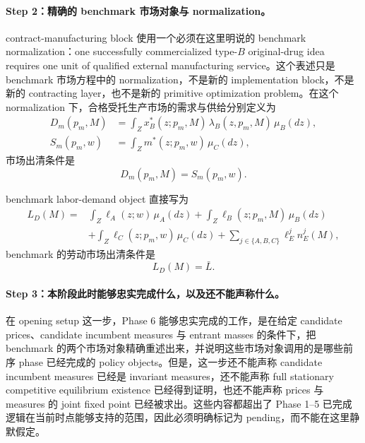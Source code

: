 \paragraph{Step 2：精确的 benchmark 市场对象与 normalization。}
contract-manufacturing block 使用一个必须在这里明说的 benchmark normalization：one successfully commercialized type-$B$ original-drug idea requires one unit of qualified external manufacturing service。这个表述只是 benchmark 市场方程中的 normalization，不是新的 implementation block，不是新的 contracting layer，也不是新的 primitive optimization problem。在这个 normalization 下，合格受托生产市场的需求与供给分别定义为
\begin{align}
D_m(p_m,M)
&=\int_Z x_B^*(z;p_m,M)\,\lambda_B(z,p_m,M)\,\mu_B(dz),
\label{eq:p6zh_Dm}\\
S_m(p_m,w)
&=\int_Z m^*(z;p_m,w)\,\mu_C(dz),
\label{eq:p6zh_Sm}
\end{align}
市场出清条件是
\begin{equation}
D_m(p_m,M)=S_m(p_m,w).
\label{eq:p6zh_pm_clear}
\end{equation}

benchmark labor-demand object 直接写为
\begin{equation}
\begin{aligned}
L_D(M)={}&\int_Z \ell_A(z;w)\,\mu_A(dz)
+\int_Z \ell_B(z;p_m,M)\,\mu_B(dz)\\
&+\int_Z \ell_C(z;p_m,w)\,\mu_C(dz)
+\sum_{j\in\{A,B,C\}}\ell_E^j n_E^j(M),
\end{aligned}
\end{equation}
benchmark 的劳动市场出清条件是
\begin{equation}
L_D(M)=\bar L.
\end{equation}

\paragraph{Step 3：本阶段此时能够忠实完成什么，以及还不能声称什么。}
在 opening setup 这一步，Phase 6 能够忠实完成的工作，是在给定 candidate prices、candidate incumbent measures 与 entrant masses 的条件下，把 benchmark 的两个市场对象精确重述出来，并说明这些市场对象调用的是哪些前序 phase 已经完成的 policy objects。但是，这一步还不能声称 candidate incumbent measures 已经是 invariant measures，还不能声称 full stationary competitive equilibrium existence 已经得到证明，也还不能声称 prices 与 measures 的 joint fixed point 已经被求出。这些内容都超出了 Phase 1--5 已完成逻辑在当前时点能够支持的范围，因此必须明确标记为 pending，而不能在这里静默假定。

